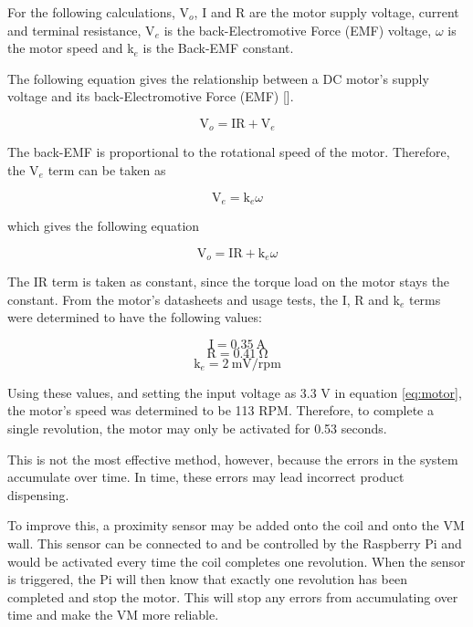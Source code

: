 For the following calculations, V$_o$, I and R are the motor supply voltage, current and
terminal resistance, V$_e$ is the back-Electromotive Force (EMF) voltage, $\omega$ is
the motor speed and k$_e$ is the Back-EMF constant.

The following equation gives the relationship between a DC motor's supply
voltage and its back-Electromotive Force (EMF) [\cite{article:motor-calc}].

\[ \mathrm{V}_o = \mathrm{IR} + \mathrm{V}_e\]

The back-EMF is proportional to the rotational speed of the motor. Therefore,
the V$_e$ term can be taken as

\[ \mathrm{V}_e = \mathrm{k}_e\omega\]

which gives the following equation

\begin{equation}
 \label{eq:motor}
 \mathrm{V}_o = \mathrm{IR} + \mathrm{k}_e\omega
\end{equation}

The IR term is taken as constant, since the torque load on the motor stays the constant.
From the motor's datasheets and usage tests, the I, R and k$_e$ terms were
determined to have the following values:

\[\mathrm{I} = 0.35\mathrm{\ A}\]
\[\mathrm{R} = 0.41\mathrm{\ \Omega}\]
\[ \mathrm{k}_e = 2 \mathrm{\ mV/rpm}\]

Using these values, and setting the input voltage as 3.3 V in equation
\ref{eq:motor}, the motor's speed was determined to be 113 RPM. Therefore, to
complete a single revolution, the motor may only be activated for 0.53 seconds. 

This is not the most effective method, however, because the errors in the system
accumulate over time. In time, these errors may lead incorrect product
dispensing. 

To improve this, a proximity sensor may be added onto the coil and onto the
VM wall. This sensor can be connected to and be controlled by the
Raspberry Pi and would be activated every time the coil completes one
revolution. When the sensor is triggered, the Pi will then know that exactly
one revolution has been completed and stop the motor. This will stop any errors
from accumulating over time and make the VM more reliable. 
